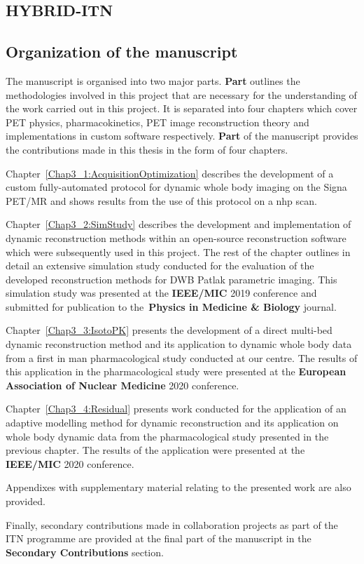 \subsection*{HYBRID-ITN}


\subsection*{Organization of the manuscript}
The manuscript is organised into two major parts. \textbf{Part } outlines the methodologies involved in this project that are necessary for the understanding of the work carried out in this project. It is separated into four chapters which cover PET physics, pharmacokinetics, PET image reconstruction theory and implementations in custom software respectively. \textbf{Part } of the manuscript provides the contributions made in this thesis in the form of four chapters.

Chapter~\ref{Chap3_1:AcquisitionOptimization} describes the development of a custom fully-automated protocol for dynamic whole body imaging on the Signa PET/MR and shows results from the use of this protocol on a \gls{nhp} scan.

Chapter~\ref{Chap3_2:SimStudy} describes the development and implementation of dynamic reconstruction methods within an open-source reconstruction software which were subsequently used in this project. The rest of the chapter outlines in detail an extensive simulation study conducted for the evaluation of the developed reconstruction methods for DWB Patlak parametric imaging. This simulation study was presented at the \textbf{IEEE/MIC} 2019 conference and submitted for publication to the~\textbf{Physics in Medicine \& Biology} journal. 

Chapter~\ref{Chap3_3:IsotoPK} presents the development of a direct multi-bed dynamic reconstruction method and its application to dynamic whole body data from a first in man pharmacological study conducted at our centre. The results of this application in the pharmacological study were presented at the \textbf{European Association of Nuclear Medicine} 2020 conference.

Chapter~\ref{Chap3_4:Residual} presents work conducted for the application of an adaptive modelling method for dynamic reconstruction and its application on whole body dynamic data from the pharmacological study presented in the previous chapter. The results of the application were presented at the \textbf{IEEE/MIC} 2020 conference.

Appendixes with supplementary material relating to the presented work are also provided.

Finally, secondary contributions made in collaboration projects as part of the ITN programme are provided at the final part of the manuscript in the \textbf{Secondary Contributions} section.